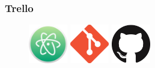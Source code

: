 \subsubsection{Trello \cite{trello}}


\begin{figure}[ht]
  \centering
  \newcommand{\managementToolsLogosHeight}{1.7cm}
  \includegraphics[height=\managementToolsLogosHeight]{assets/tools/management/atom.png}
  \includegraphics[height=\managementToolsLogosHeight]{assets/tools/management/git.png}
  \includegraphics[height=\managementToolsLogosHeight]{assets/tools/management/github.png}

\end{figure}
